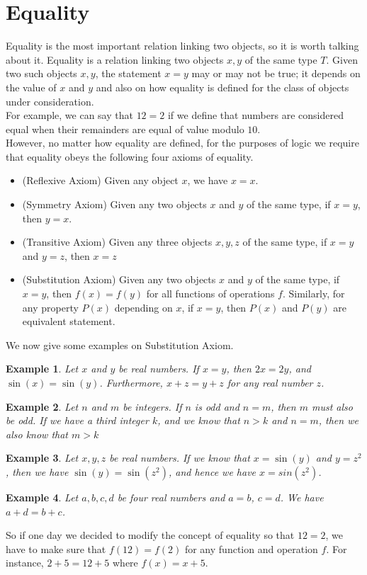 \documentclass[a4paper]{book}
\newtheorem{example}{Example}[section]
\begin{document}
		\section{Equality}
			Equality is the most important relation linking two objects, so it is worth talking about it. Equality is a relation linking two objects $x,y$ of the same type $T$. Given two such objects $x,y$, the statement $x=y$ may or may not be true; it depends on the value of $x$ and $y$ and also on how equality is defined for the class of objects under consideration.\\
			For example, we can say that $12=2$ if we define that numbers are considered equal when their remainders are equal of value modulo $10$.\\
			However, no matter how equality are defined, for the purposes of logic we require that equality obeys the following four axioms of equality.
			\begin{itemize}
				\item (Reflexive Axiom) Given any object $x$, we have $x=x$.
				\item (Symmetry Axiom) Given any two objects $x$ and $y$ of the same type, if $x=y$, then $y=x$.
				\item (Transitive Axiom) Given any three objects $x,y,z$ of the same type, if $x=y$ and $y=z$, then $x=z$
				\item (Substitution Axiom) Given any two objects $x$ and $y$ of the same type, if $x=y$, then $f(x)=f(y)$ for all functions of operations $f$. Similarly, for any property $P(x)$ depending on $x$, if $x=y$, then $P(x)$ and $P(y)$ are equivalent statement.
			\end{itemize}
			We now give some examples on Substitution Axiom.
			\begin{example}
				Let $x$ and $y$ be real numbers. If $x=y$, then $2x=2y$, and $\sin(x)=\sin(y)$. Furthermore, $x+z=y+z$ for any real number $z$.
			\end{example}
			\begin{example}
				Let $n$ and $m$ be integers. If $n$ is odd and $n=m$, then $m$ must also be odd. If we have a third integer $k$, and we know that $n>k$ and $n=m$, then we also know that $m>k$
			\end{example}
			\begin{example}
				Let $x,y,z$ be real numbers. If we know that $x=\sin(y)$ and $y=z^2$, then we have $\sin(y)=\sin(z^2)$, and hence we have $x=sin(z^2)$.
			\end{example}
			\begin{example}
				Let $a,b,c,d$ be four real numbers and $a=b$, $c=d$. We have $a+d=b+c$.
			\end{example}
			So if one day we decided to modify the concept of equality so that $12=2$, we have to make sure that $f(12)=f(2)$ for any function and operation $f$. For instance, $2+5=12+5$ where $f(x)=x+5$.
\end{document}
